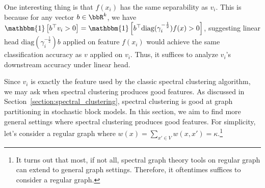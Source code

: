 \newcommand{\id}[1]{\mathbbm{1}\left[#1\right]}

One interesting thing is that $f(x_i)$ has the same separability as $v_i$. This is because for any vector $b\in\bbR^k$, we have $\id{b^\top v_i>0} = \id{b^\top \text{diag}(\gamma_i^{-\frac{1}{2}}) f(x) >0}$, suggesting linear head $\text{diag}(\gamma_i^{-\frac{1}{2}}) b$ applied on feature $f(x_i)$ would achieve the same classification accuracy as $v$ applied on $v_i$. Thus, it suffices to analyze $v_i$'s downstream accuracy under linear head.

Since $v_i$ is exactly the feature used by the classic spectral clustering algorithm, we may ask when spectral clustering produces good features. As discussed in Section~\ref{section:spectral_clustering}, spectral clustering is good at graph partitioning in stochastic block models. In this section, we aim to find more general settings where spectral clustering produces good features. For simplicity, let's consider a regular graph where $w(x) = \sum_{x'\in V} w(x, x') = \kappa$.\footnote{It turns out that most, if not all, spectral graph theory tools on regular graph can extend to general graph settings. Therefore, it oftentimes suffices to consider a regular graph. } %

